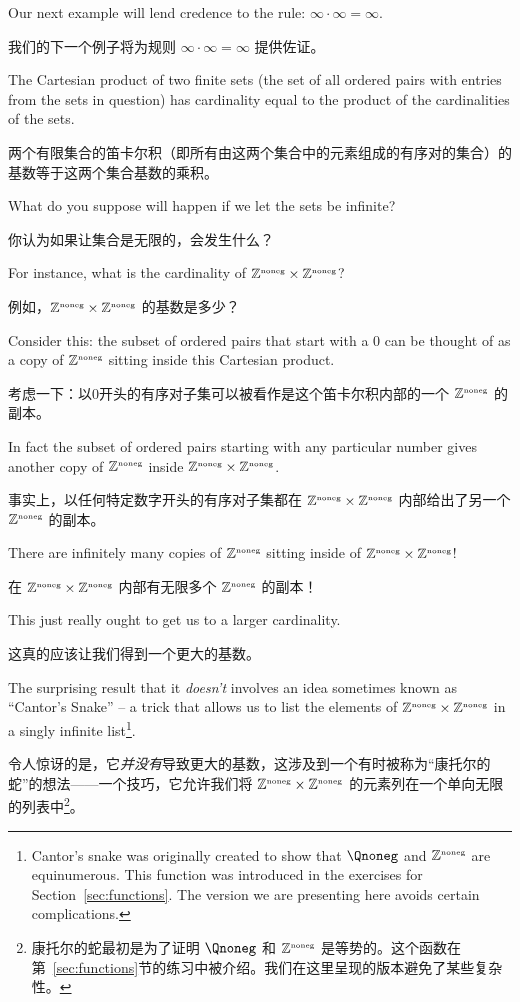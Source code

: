 Our next example will lend
credence to the rule: $\infty \cdot \infty = \infty$.

我们的下一个例子将为规则 $\infty \cdot \infty = \infty$ 提供佐证。

The Cartesian product of two finite sets (the set of all
ordered pairs with entries from the sets in question) has
cardinality equal to the product of the cardinalities of
the sets.

两个有限集合的笛卡尔积（即所有由这两个集合中的元素组成的有序对的集合）的基数等于这两个集合基数的乘积。

What do you suppose will happen if we let the sets
be infinite?

你认为如果让集合是无限的，会发生什么？

For instance, what is the cardinality of
${\mathbb Z}^{\mbox{\tiny noneg}} \times {\mathbb Z}^{\mbox{\tiny noneg}}$?

例如，${\mathbb Z}^{\mbox{\tiny noneg}} \times {\mathbb Z}^{\mbox{\tiny noneg}}$ 的基数是多少？

Consider this:
the subset of ordered pairs that start with a 0 can be thought of as a copy
of ${\mathbb Z}^{\mbox{\tiny noneg}}$ sitting inside this Cartesian product.

考虑一下：以0开头的有序对子集可以被看作是这个笛卡尔积内部的一个 ${\mathbb Z}^{\mbox{\tiny noneg}}$ 的副本。

In fact
the subset of ordered pairs
starting with any particular number gives another copy of ${\mathbb Z}^{\mbox{\tiny noneg}}$
inside ${\mathbb Z}^{\mbox{\tiny noneg}} \times {\mathbb Z}^{\mbox{\tiny noneg}}$.

事实上，以任何特定数字开头的有序对子集都在 ${\mathbb Z}^{\mbox{\tiny noneg}} \times {\mathbb Z}^{\mbox{\tiny noneg}}$ 内部给出了另一个 ${\mathbb Z}^{\mbox{\tiny noneg}}$ 的副本。

There
are infinitely many copies of ${\mathbb Z}^{\mbox{\tiny noneg}}$  sitting inside of
${\mathbb Z}^{\mbox{\tiny noneg}} \times {\mathbb Z}^{\mbox{\tiny noneg}}$!

在 ${\mathbb Z}^{\mbox{\tiny noneg}} \times {\mathbb Z}^{\mbox{\tiny noneg}}$ 内部有无限多个 ${\mathbb Z}^{\mbox{\tiny noneg}}$ 的副本！

This just really ought
to get us to a larger cardinality.

这真的应该让我们得到一个更大的基数。

The surprising result that it
\emph{doesn't} involves an idea sometimes known as
  ``Cantor's Snake'' -- a trick that allows
us to list the elements of ${\mathbb Z}^{\mbox{\tiny noneg}} \times {\mathbb Z}^{\mbox{\tiny noneg}}$ in a singly
infinite list\footnote{Cantor's snake was originally created to show
    that $\Qnoneg$ and ${\mathbb Z}^{\mbox{\tiny noneg}}$ are equinumerous.
    This function was introduced in the exercises for
    Section~\ref{sec:functions}.   The version we are presenting
    here avoids certain complications.}.

令人惊讶的是，它\emph{并没有}导致更大的基数，这涉及到一个有时被称为“康托尔的蛇”的想法——一个技巧，它允许我们将 ${\mathbb Z}^{\mbox{\tiny noneg}} \times {\mathbb Z}^{\mbox{\tiny noneg}}$ 的元素列在一个单向无限的列表中\footnote{康托尔的蛇最初是为了证明 $\Qnoneg$ 和 ${\mathbb Z}^{\mbox{\tiny noneg}}$ 是等势的。这个函数在第~\ref{sec:functions}节的练习中被介绍。我们在这里呈现的版本避免了某些复杂性。}。

